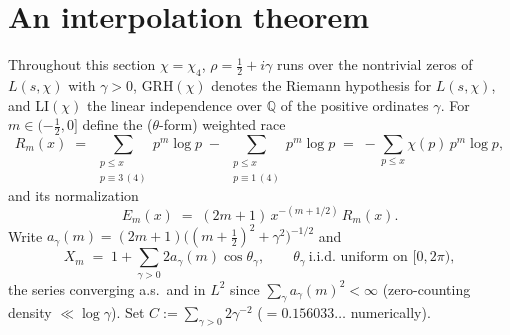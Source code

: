 %

\section{An interpolation theorem}\label{sec:theorem}

Throughout this section $\chi=\chi_4$, $\rho=\tfrac12+i\gamma$ runs over
the nontrivial zeros of $L(s,\chi)$ with $\gamma>0$, GRH$(\chi)$ denotes
the Riemann hypothesis for $L(s,\chi)$, and LI$(\chi)$ the linear
independence over $\mathbb Q$ of the positive ordinates $\gamma$. For
$m\in(-\tfrac12,0]$ define the ($\theta$-form) weighted race
\[
R_m(x)\;=\;\sum_{\substack{p\le x\\ p\equiv3\,(4)}}p^m\log p
\;-\;\sum_{\substack{p\le x\\ p\equiv1\,(4)}}p^m\log p
\;=\;-\sum_{p\le x}\chi(p)\,p^m\log p ,
\]
and its normalization
\[
E_m(x)\;=\;(2m+1)\,x^{-(m+1/2)}\,R_m(x).
\]
Write $a_\gamma(m)=(2m+1)\bigl((m+\tfrac12)^2+\gamma^2\bigr)^{-1/2}$ and
\[
X_m\;=\;1+\sum_{\gamma>0}2a_\gamma(m)\cos\theta_\gamma ,
\qquad \theta_\gamma\ \text{i.i.d.\ uniform on }[0,2\pi),
\]
the series converging a.s.\ and in $L^2$ since
$\sum_\gamma a_\gamma(m)^2<\infty$ (zero-counting density
$\ll\log\gamma$). Set $C:=\sum_{\gamma>0}2\gamma^{-2}$
($=0.156033\ldots$ numerically).

